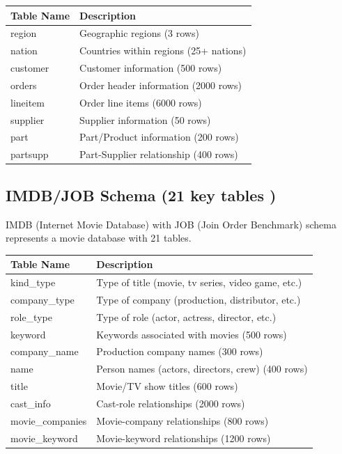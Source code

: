 \documentclass[12pt,a4paper]{article}
\begin{document}
\begin{table}[h]
\centering
\begin{tabular}{|l|l|}
\hline
\textbf{Table Name} & \textbf{Description} \\
\hline
region & Geographic regions (3 rows) \\
nation & Countries within regions (25+ nations) \\
customer & Customer information (500 rows) \\
orders & Order header information (2000 rows) \\
lineitem & Order line items (6000 rows) \\
supplier & Supplier information (50 rows) \\
part & Part/Product information (200 rows) \\
partsupp & Part-Supplier relationship (400 rows) \\
\hline
\end{tabular}
\end{table}

\subsection{IMDB/JOB Schema (21  key tables )}
IMDB (Internet Movie Database) with JOB (Join Order Benchmark) schema represents a movie database with 21 tables.

\begin{table}[h]
\centering
\begin{tabular}{|l|l|}
\hline
\textbf{Table Name} & \textbf{Description} \\
\hline
kind\_type & Type of title (movie, tv series, video game, etc.) \\
company\_type & Type of company (production, distributor, etc.) \\
role\_type & Type of role (actor, actress, director, etc.) \\
keyword & Keywords associated with movies (500 rows) \\
company\_name & Production company names (300 rows) \\
name & Person names (actors, directors, crew) (400 rows) \\
title & Movie/TV show titles (600 rows) \\
cast\_info & Cast-role relationships (2000 rows) \\
movie\_companies & Movie-company relationships (800 rows) \\
movie\_keyword & Movie-keyword relationships (1200 rows) \\
\hline
\end{tabular}
\end{table}
\end{document}
